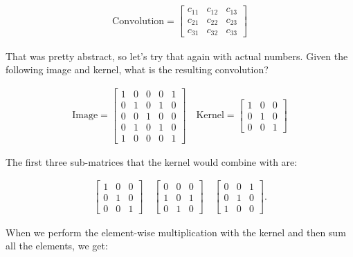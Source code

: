\begin{align}
    \text{Convolution}=
    \begin{bmatrix}
        c_{11} & c_{12} & c_{13}\\
        c_{21} & c_{22} & c_{23}\\
        c_{31} & c_{32} & c_{33}
    \end{bmatrix}
\end{align}

That was pretty abstract, so let's try that again with actual numbers. Given the following image and kernel, what is the resulting convolution?

\begin{align}
    \text{Image}=
    \begin{bmatrix}
        1 & 0 & 0 & 0 & 1 \\
        0 & 1 & 0 & 1 & 0 \\
        0 & 0 & 1 & 0 & 0 \\
        0 & 1 & 0 & 1 & 0 \\
        1 & 0 & 0 & 0 & 1
    \end{bmatrix}
    \quad
    \text{Kernel}=
    \begin{bmatrix}
        1 & 0 & 0 \\
        0 & 1 & 0 \\
        0 & 0 & 1
    \end{bmatrix}
\end{align}

\noindent The first three sub-matrices that the kernel would combine with are:

\begin{align}
    \begin{bmatrix}
        1 & 0 & 0 \\
        0 & 1 & 0 \\
        0 & 0 & 1 
    \end{bmatrix}\quad
    \begin{bmatrix}
        0 & 0 & 0\\
        1 & 0 & 1\\
        0 & 1 & 0
    \end{bmatrix}\quad
    \begin{bmatrix}
        0 & 0 & 1 \\
        0 & 1 & 0 \\
        1 & 0 & 0
    \end{bmatrix}.
\end{align}

\noindent When we perform the element-wise multiplication with the kernel and then sum all the elements, we get:

